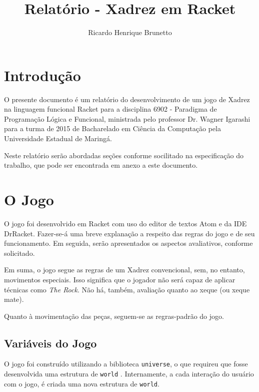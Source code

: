 

\sloppy

\title{Relatório - Xadrez em Racket}

\author{Ricardo Henrique Brunetto}


\address{Departamento de Informática -- Universidade Estadual de Maringá (UEM)\\
	Maringá -- PR -- Brasil
}



	\maketitle

	{\resumo{}}

  \section{Introdução}
	O presente documento é um relatório do desenvolvimento de um jogo de Xadrez na
	linguagem funcional Racket para a disciplina 6902 - Paradigma de Programação Lógica
	e Funcional, ministrada pelo professor Dr. Wagner Igarashi para a turma de 2015
	de Bacharelado em Ciência da Computação pela Universidade Estadual de Maringá.

	Neste relatório serão abordadas seções conforme socilitado na especificação do trabalho,
	que pode ser encontrada em anexo a este documento.

	\section{O Jogo}

	O jogo foi desenvolvido em Racket com uso do editor de textos Atom e da IDE DrRacket.
	Fazer-se-á uma breve explanação a respeito das regras do jogo e de seu funcionamento.
	Em seguida, serão apresentados os aspectos avaliativos, conforme solicitado.

	Em suma, o jogo segue as regras de um Xadrez convencional, sem, no entanto, movimentos especiais.
	Isso significa que o jogador não será capaz de aplicar técnicas como \textit{The Rock}. Não há,
	também, avaliação quanto ao xeque (ou xeque mate).

	Quanto à movimentação das peças, seguem-se as regras-padrão do jogo.

	\subsection{Variáveis do Jogo}
	O jogo foi construído utilizando a biblioteca \verb|universe|, o que requireu que fosse desenvolvida
	uma estrutura de \verb|world| \cite{racketdoc}. Internamente, a cada interação do usuário com o jogo,
	é criada uma nova estrutura de \verb|world|.

